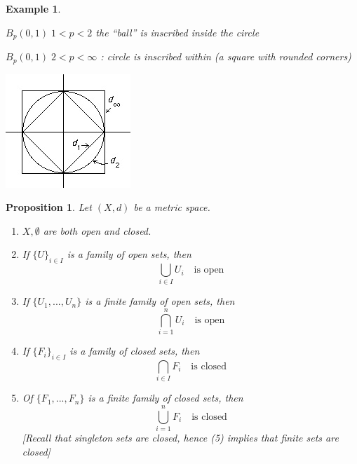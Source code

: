 \documentclass[11pt, oneside]{book}
\theoremstyle{break}
\newtheorem{propo}{Proposition}[section]
\newtheorem{eg}{Example}[section]
\begin{document}
\begin{eg}
\begin{enumerate}
			$B_p (0, 1) \; 1 < p < 2$ the ``ball'' is inscribed inside the circle

			$B_p(0, 1) \; 2 < p < \infty$ : circle is inscribed within (a square with rounded corners)

			\begin{center}
				\includegraphics{images/geometryOfBalls.jpg}	
			\end{center}
	\end{enumerate}
\end{eg}

\begin{propo}
	Let $(X, d)$ be a metric space.
	\begin{enumerate}
		\item $X, \emptyset$ are both open and closed.
		\item If $\{U\}_{i \in I}$ is a family of open sets, then
			\begin{equation}
				\bigcup_{i \in I} U_i \quad \text{is open}
			\end{equation}
		\item If $\{U_1, ..., U_n\}$ is a finite family of open sets, then
			\begin{equation}
				\bigcap_{i = 1}^{n} U_i \quad \text{is open}
			\end{equation}
		\item If $\{F_i\}_{i \in I}$ is a family of closed sets, then
			\begin{equation}
				\bigcap_{i \in I} F_i \quad \text{is closed}
			\end{equation}
		\item Of $\{F_1, ..., F_n\}$ is a finite family of closed sets, then
			\begin{equation}
				\bigcup_{i = 1}^{n} F_i \quad \text{is closed}
			\end{equation}
			[Recall that singleton sets are closed, hence (5) implies that finite sets are closed]
	\end{enumerate}
\end{propo}
\end{document}
